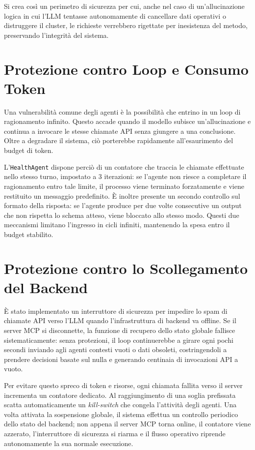 Si crea così un perimetro di sicurezza per cui, anche nel caso di un'allucinazione logica in cui l'LLM tentasse autonomamente di cancellare dati operativi o distruggere il cluster, le richieste verrebbero rigettate per inesistenza del metodo, preservando l'integrità del sistema.

\section{Protezione contro Loop e Consumo Token}
\label{sec:protezione_loop}

Una vulnerabilità comune degli agenti è la possibilità che entrino in un loop di ragionamento infinito. Questo accade quando il modello subisce un'allucinazione e continua a invocare le stesse chiamate API senza giungere a una conclusione. Oltre a degradare il sistema, ciò porterebbe rapidamente all'esaurimento del budget di token.

L'\texttt{HealthAgent} dispone perciò di un contatore che traccia le chiamate effettuate nello stesso turno, impostato a 3 iterazioni: se l'agente non riesce a completare il ragionamento entro tale limite, il processo viene terminato forzatamente e viene restituito un messaggio predefinito. È inoltre presente un secondo controllo sul formato della risposta: se l'agente produce per due volte consecutive un output che non rispetta lo schema atteso, viene bloccato allo stesso modo. Questi due meccanismi limitano l'ingresso in cicli infiniti, mantenendo la spesa entro il budget stabilito.

\section{Protezione contro lo Scollegamento del Backend}
\label{sec:kill_switch_backend}

È stato implementato un interruttore di sicurezza per impedire lo spam di chiamate API verso l'LLM quando l'infrastruttura di backend va offline. Se il server MCP si disconnette, la funzione di recupero dello stato globale fallisce sistematicamente: senza protezioni, il loop continuerebbe a girare ogni pochi secondi inviando agli agenti contesti vuoti o dati obsoleti, costringendoli a prendere decisioni basate sul nulla e generando centinaia di invocazioni API a vuoto.

Per evitare questo spreco di token e risorse, ogni chiamata fallita verso il server incrementa un contatore dedicato. Al raggiungimento di una soglia prefissata scatta automaticamente un \textit{kill-switch} che congela l'attività degli agenti. Una volta attivata la sospensione globale, il sistema effettua un controllo periodico dello stato del backend; non appena il server MCP torna online, il contatore viene azzerato, l'interruttore di sicurezza si riarma e il flusso operativo riprende autonomamente la sua normale esecuzione.


